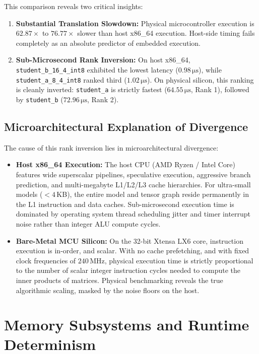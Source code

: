 \documentclass[journal,10pt]{IEEEtran}
\begin{document}
This comparison reveals two critical insights:
\begin{enumerate}
    \item \textbf{Substantial Translation Slowdown:} Physical microcontroller execution is $62.87\times$ to $76.77\times$ slower than host x86\_64 execution. Host-side timing fails completely as an absolute predictor of embedded execution.
    \item \textbf{Sub-Microsecond Rank Inversion:} On host x86\_64, \texttt{student\_b\_16\_4\_int8} exhibited the lowest latency ($0.98\,\si{\micro\second}$), while \texttt{student\_a\_8\_4\_int8} ranked third ($1.02\,\si{\micro\second}$). On physical silicon, this ranking is cleanly inverted: \texttt{student\_a} is strictly fastest ($64.55\,\si{\micro\second}$, Rank 1), followed by \texttt{student\_b} ($72.96\,\si{\micro\second}$, Rank 2).
\end{enumerate}

\subsection{Microarchitectural Explanation of Divergence}
The cause of this rank inversion lies in microarchitectural divergence:
\begin{itemize}
    \item \textbf{Host x86\_64 Execution:} The host CPU (AMD Ryzen / Intel Core) features wide superscalar pipelines, speculative execution, aggressive branch prediction, and multi-megabyte L1/L2/L3 cache hierarchies. For ultra-small models ($<4$\,KB), the entire model and tensor graph reside permanently in the L1 instruction and data caches. Sub-microsecond execution time is dominated by operating system thread scheduling jitter and timer interrupt noise rather than integer ALU compute cycles.
    \item \textbf{Bare-Metal MCU Silicon:} On the 32-bit Xtensa LX6 core, instruction execution is in-order, and scalar. With no cache prefetching, and with fixed clock frequencies of $240\,\text{MHz}$, physical execution time is strictly proportional to the number of scalar integer instruction cycles needed to compute the inner products of matrices. Physical benchmarking reveals the true algorithmic scaling, masked by the noise floors on the host.
\end{itemize}

\section{Memory Subsystems and Runtime Determinism}
\end{document}
